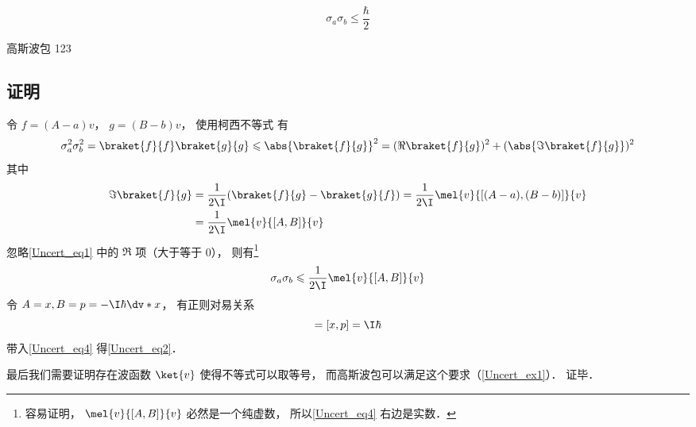 

\begin{equation}\label{Uncert_eq2}
\sigma_a \sigma_b \leqslant \frac{\hbar}{2}
\end{equation}

\begin{example}{高斯波包}\label{Uncert_ex1}
123
\end{example}

\subsection{证明}
令 $f = (A-a)v$， $g = (B-b)v$， 使用柯西不等式 有
\begin{equation}\label{Uncert_eq1}
\sigma_a^2 \sigma_b^2 = \braket{f}{f} \braket{g}{g} \leqslant \abs{\braket{f}{g}}^2 = (\Re\braket{f}{g})^2 + (\abs{\Im\braket{f}{g}})^2
\end{equation}
其中
\begin{equation}
\begin{aligned}
\Im\braket{f}{g} &= \frac{1}{2\I}(\braket{f}{g} - \braket{g}{f})
= \frac{1}{2\I}\mel{v}{[(A-a), (B-b)]}{v}\\
&= \frac{1}{2\I}\mel{v}{[A, B]}{v}
\end{aligned}
\end{equation}
忽略\autoref{Uncert_eq1} 中的 $\Re$ 项（大于等于 0）， 则有\footnote{容易证明， $\mel{v}{[A, B]}{v}$ 必然是一个纯虚数， 所以\autoref{Uncert_eq4} 右边是实数．}
\begin{equation}\label{Uncert_eq4}
\sigma_a \sigma_b \leqslant \frac{1}{2\I}\mel{v}{[A, B]}{v}
\end{equation}
令 $A = x, B = p = -\I\hbar \dv*{x}$， 有正则对易关系
\begin{equation}
[A, B] = [x, p] = \I\hbar
\end{equation}
带入\autoref{Uncert_eq4} 得\autoref{Uncert_eq2}． 

最后我们需要证明存在波函数 $\ket{v}$ 使得不等式可以取等号， 而高斯波包可以满足这个要求（\autoref{Uncert_ex1}）．%
证毕．
